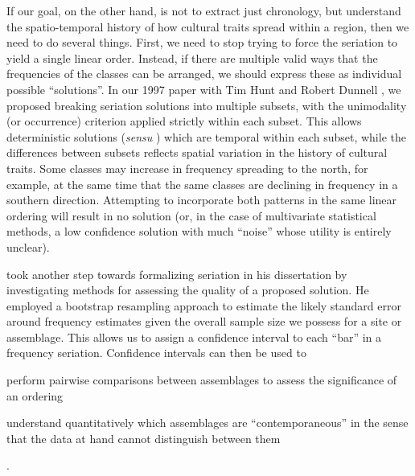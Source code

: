     If our goal, on the other hand, is not to extract just chronology, but understand the spatio-temporal history of how cultural traits spread within a region, then we need to do several things.  First, we need to stop trying to force the seriation to yield a single linear order.  Instead, if there are multiple valid ways that the frequencies of the classes can be arranged, we should express these as individual possible ``solutions''.  In our 1997 paper with Tim Hunt and Robert Dunnell \citeyearpar{Lipo1997}, we proposed breaking seriation solutions into multiple subsets, with the unimodality (or occurrence) criterion applied strictly within each subset.  This allows deterministic solutions (\emph{sensu} \citealt{Dunnell1970,Dunnell1981}) which are temporal within each subset, while the differences between subsets reflects spatial variation in the history of cultural traits.  Some classes may increase in frequency spreading to the north, for example, at the same time that the same classes are declining in frequency in a southern direction.  Attempting to incorporate both patterns in the same linear ordering will result in no solution (or, in the case of multivariate statistical methods, a low confidence solution with much ``noise'' whose utility is entirely unclear).  
    
    \citet{Lipo2001} took another step towards formalizing seriation in his dissertation by investigating methods for assessing the quality of a proposed solution.  He employed a bootstrap resampling approach to estimate the likely standard error around frequency estimates given the overall sample size we possess for a site or assemblage.  This allows us to assign a confidence interval to each  ``bar'' in a frequency seriation.  Confidence intervals can then be used to \begin{dissparalist}
    \item perform pairwise comparisons between assemblages to assess the significance of an ordering 
    \item understand quantitatively which assemblages are ``contemporaneous'' in the sense that the data at hand cannot distinguish between them
    \end{dissparalist}.  
    
